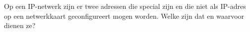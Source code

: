 Op een IP-netwerk zijn er twee adressen die special zijn en die niet als IP-adres op een netwerkkaart geconfigureert mogen worden. Welke zijn dat en waarvoor dienen ze?
